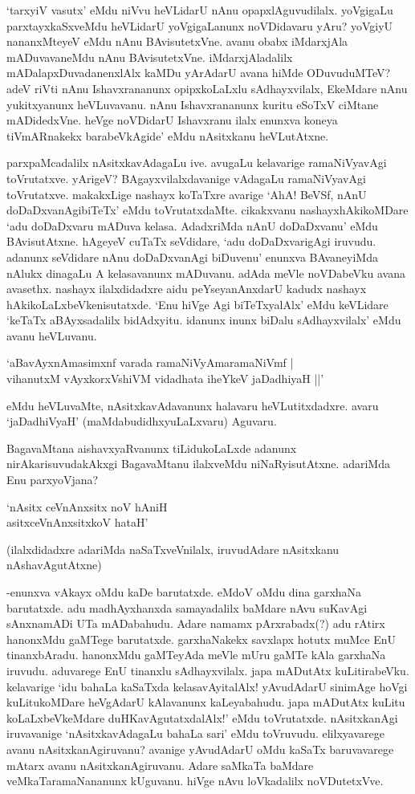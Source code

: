 `tarxyiV vasutx' eMdu niVvu heVLidarU nAnu opapxlAguvudilalx. yoVgigaLu parxtayxkaSxveMdu heVLidarU yoVgigaLanunx noVDidavaru yAru? yoVgiyU nananxMteyeV eMdu nAnu BAvisutetxVne. avanu obabx iMdarxjAla mADuvavaneMdu nAnu BAvisutetxVne. iMdarxjAladalilx mADalapxDuvadanenxlAlx kaMDu yArAdarU avana hiMde ODuvuduMTeV? adeV riVti nAnu Ishavxrananunx opipxkoLaLxlu sAdhayxvilalx, EkeMdare nAnu yukitxyanunx heVLuvavanu. nAnu Ishavxrananunx kuritu eSoTxV ciMtane mADidedxVne. heVge noVDidarU Ishavxranu ilalx enunxva koneya tiVmARnakekx barabeVkAgide' eMdu nAsitxkanu heVLutAtxne.

parxpaMcadalilx nAsitxkavAdagaLu ive. avugaLu kelavarige ramaNiVyavAgi toVrutatxve. yArigeV? BAgayxvilalxdavanige vAdagaLu ramaNiVyavAgi toVrutatxve. makakxLige nashayx koTaTxre avarige `AhA! BeVSf, nAnU doDaDxvanAgibiTeTx' eMdu toVrutatxdaMte. cikakxvanu nashayxhAkikoMDare `adu doDaDxvaru mADuva kelasa. AdadxriMda nAnU doDaDxvanu' eMdu BAvisutAtxne. hAgeyeV cuTaTx seVdidare, `adu doDaDxvarigAgi iruvudu. adanunx seVdidare nAnu doDaDxvanAgi biDuvenu' enunxva BAvaneyiMda nAlukx dinagaLu A kelasavanunx mADuvanu. adAda meVle noVDabeVku avana avasethx. nashayx ilalxdidadxre aidu peYseyanAnxdarU kadudx nashayx hAkikoLaLxbeVkenisutatxde. `Enu hiVge Agi biTeTxyalAlx' eMdu keVLidare `keTaTx aBAyxsadalilx bidAdxyitu. idanunx inunx biDalu sAdhayxvilalx' eMdu avanu heVLuvanu.

\begin{shloka}
`aBavAyxnAmasimxnf varada ramaNiVyAmaramaNiVmf |\\
vihanutxM vAyxkorxVshiVM vidadhata iheYkeV jaDadhiyaH ||'
\end{shloka}

eMdu heVLuvaMte, nAsitxkavAdavanunx halavaru heVLutitxdadxre. avaru `jaDadhiVyaH' (maMdabudidhxyuLaLxvaru) Aguvaru.

BagavaMtana aishavxyaRvanunx tiLidukoLaLxde adanunx nirAkarisuvudakAkxgi BagavaMtanu ilalxveMdu niNaRyisutAtxne. adariMda Enu parxyoVjana?

\begin{shloka}
`nAsitx ceVnAnxsitx noV hAniH\\
asitxceVnAnxsitxkoV hataH'
\end{shloka}

(ilalxdidadxre adariMda naSaTxveVnilalx, iruvudAdare nAsitxkanu nAshavAgutAtxne)

-enunxva vAkayx oMdu kaDe barutatxde. eMdoV oMdu dina garxhaNa barutatxde. adu madhAyxhanxda samayadalilx baMdare nAvu suKavAgi sAnxnamADi UTa mADabahudu. Adare namamx pArxrabadx(?) adu rAtirx hanonxMdu gaMTege barutatxde. garxhaNakekx savxlapx hotutx muMce EnU tinanxbAradu. hanonxMdu gaMTeyAda meVle mUru gaMTe kAla garxhaNa iruvudu. aduvarege EnU tinanxlu sAdhayxvilalx. japa mADutAtx kuLitirabeVku. kelavarige `idu bahaLa kaSaTxda kelasavAyitalAlx! yAvudAdarU sinimAge hoVgi kuLitukoMDare heVgAdarU kAlavanunx kaLeyabahudu. japa mADutAtx kuLitu koLaLxbeVkeMdare duHKavAgutatxdalAlx!' eMdu toVrutatxde. nAsitxkanAgi iruvavanige `nAsitxkavAdagaLu bahaLa sari' eMdu toVruvudu. elilxyavarege avanu nAsitxkanAgiruvanu? avanige yAvudAdarU oMdu kaSaTx baruvavarege mAtarx avanu nAsitxkanAgiruvanu. Adare saMkaTa baMdare veMkaTaramaNananunx kUguvanu. hiVge nAvu loVkadalilx noVDutetxVve.

